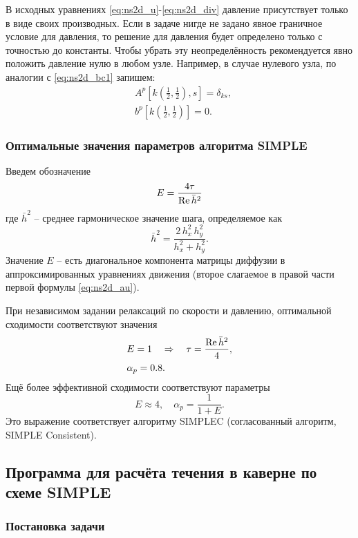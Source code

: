 В исходных уравнениях
\eqref{eq:ns2d_u}-\eqref{eq:ns2d_div}
давление присутствует только в виде своих производных.
Если в задаче нигде не задано явное граничное условие
для давления, то решение для давления
будет определено только с точностью до константы.
Чтобы убрать эту неопределённость
рекомендуется явно положить давление нулю
в любом узле. Например, в случае нулевого узла,
по аналогии с \eqref{eq:ns2d_bc1} запишем:
\begin{align}
    \label{eq:ns2d_bc4}
    &A^p[k(\tfrac12, \tfrac12), s] = \delta_{ks}, \\[10pt]
    \nonumber
    &b^{p}[k(\tfrac12, \tfrac12)] = 0.
\end{align}

\subsubsection{Оптимальные значения параметров алгоритма SIMPLE}

Введем обозначение
\begin{equation*}
\label{eq:ns2d-simple-e}
E = \frac{4\tau}{\mathrm{Re}\,\bar h^2}
\end{equation*}
где ${\bar h^2}$ -- среднее гармоническое значение шага, определяемое как
$$
\bar h^2 = \frac{2\,h_x^2\,h_y^2}{h_x^2 + h_y^2}.
$$
Значение $E$ -- есть диагональное компонента матрицы диффузии
в аппроксимированных уравнениях движения (второе слагаемое в правой части первой формулы \cref{eq:ns2d_au}).

При независимом задании релаксаций по скорости и давлению,
оптимальной сходимости соответствуют значения
\begin{align*}
&E = 1 \quad\Rightarrow\quad \tau = \frac{\mathrm{Re} \,\bar h^2}{4}, \\
&\alpha_p = 0.8.
\end{align*}
Ещё более эффективной сходимости соответствуют параметры
\begin{equation}
\label{eq:ns2d-simplec}
E \approx 4, \quad \alpha_p = \frac{1}{1+E}.
\end{equation}
Это выражение соответствует алгоритму SIMPLEC (согласованный алгоритм, SIMPLE Consistent).

\subsection{Программа для расчёта течения в каверне по схеме SIMPLE}
\label{sec:prog-cavity2}

\subsubsection{Постановка задачи}

